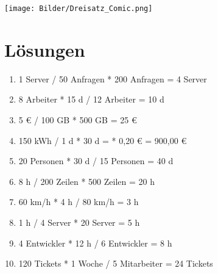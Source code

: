 \documentclass{orgstandard}
\begin{document}
\clearpage
\begin{center}
\texttt{[image: Bilder/Dreisatz\_Comic.png]}
\end{center}

\section{Lösungen}
\label{sec:org7e005e3}
\begin{enumerate}
\item 1 Server / 50 Anfragen * 200 Anfragen = 4 Server
\item 8 Arbeiter * 15 d / 12 Arbeiter = 10 d
\item 5 € / 100 GB * 500 GB = 25 €
\item 150 kWh / 1 d * 30 d =  * 0,20 € = 900,00 €
\item 20 Personen * 30 d / 15 Personen = 40 d
\item 8 h / 200 Zeilen * 500 Zeilen = 20 h
\item 60 km/h * 4 h / 80 km/h = 3 h
\item 1 h / 4 Server * 20 Server = 5 h
\item 4 Entwickler * 12 h / 6 Entwickler = 8 h
\item 120 Tickets * 1 Woche / 5 Mitarbeiter = 24 Tickets
\end{enumerate}
\end{document}
